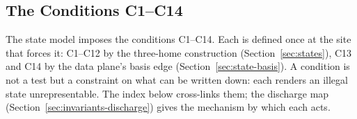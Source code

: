 \subsection{The Conditions C1--C14}
\label{sec:invariants-conditions}

The state model imposes the conditions C1--C14. Each is defined once at the site that forces it: C1--C12 by the three-home construction (Section~\ref{sec:states}), C13 and C14 by the data plane's basis edge (Section~\ref{sec:state-basis}). A condition is not a test but a constraint on what can be written down: each renders an illegal state unrepresentable. The index below cross-links them; the discharge map (Section~\ref{sec:invariants-discharge}) gives the mechanism by which each acts.

